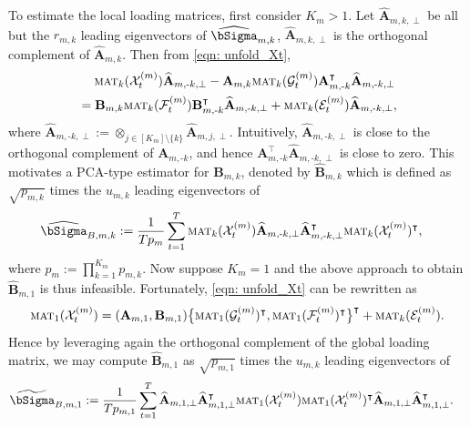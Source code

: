 \documentclass[aos]{imsart}
\theoremstyle{plain}
\theoremstyle{definition}
\def\mat{\textnormal{\textsc{mat}}}
\def\wt#1{\widetilde{#1}}
\def\wh#1{\widehat{#1}}
\def\cE{\mathcal{E}}
\def\cF{\mathcal{F}}
\def\cG{\mathcal{G}} \def\cH{\boldsymbol{\mathcal{H}}} \def\cI{\mathcal{I}}
\def\cX{\mathcal{X}}
\def\bA{\mathbf{A}}
\def\bB{\mathbf{B}}
\def\trans{\intercal}
\begin{document}
To estimate the local loading matrices, first consider $K_m> 1$. Let $\wh{\bA}_{m,k,\perp}$ be
all but the $r_{m,k}$ leading eigenvectors of $\wh\bSigma_{m,k}$,  $\wh{\bA}_{m,k,\perp}$ is the orthogonal complement of $\wh{\bA}_{m,k}$. Then from \eqref{eqn: unfold_Xt},
\begin{align*}
    &\;\quad
    \mat_k(\cX_t^{(m)}) \wh{\bA}_{m,\text{-}k,\perp} - \bA_{m,k} \mat_k(\cG_t^{(m)}) \bA_{m,\text{-}k}^\trans \wh{\bA}_{m,\text{-}k,\perp} \\
    &= \bB_{m,k} \mat_k(\cF_t^{(m)}) \bB_{m,\text{-}k}^\trans \wh{\bA}_{m,\text{-}k,\perp} + \mat_k(\cE_t^{(m)}) \wh{\bA}_{m,\text{-}k,\perp} ,
\end{align*}
where $\wh{\bA}_{m,\text{-}k,\perp} := \otimes_{j\in[K_m] \setminus\{k\}} \wh{\bA}_{m,j,\perp}$. Intuitively, $\wh{\bA}_{m,\text{-}k,\perp}$ is close to the orthogonal complement of $\bA_{m,\text{-}k}$, and hence $\bA_{m,\text{-}k}^\trans \wh{\bA}_{m,\text{-}k,\perp}$ is close to zero. This motivates a PCA-type estimator for $\bB_{m,k}$, denoted by $\wh{\bB}_{m,k}$ which is defined as $\sqrt{p_{m,k}}$ times the $u_{m,k}$ leading eigenvectors of
\begin{equation}
\label{eqn: def_hat_Sigma_B_mk}
\begin{split}
    \wh\bSigma_{B,m,k} &:= \frac{1}{Tp_m} \sum_{t=1}^T \mat_k(\cX_t^{(m)}) \wh{\bA}_{m,\text{-}k,\perp} \wh{\bA}_{m,\text{-}k,\perp}^\trans \mat_k(\cX_t^{(m)})^\trans ,
\end{split}
\end{equation}
where $p_m:= \prod_{k=1}^{K_m} p_{m,k}$. Now suppose $K_m=1$ and the above approach to obtain $\wh{\bB}_{m,1}$ is thus infeasible. Fortunately, \eqref{eqn: unfold_Xt} can be rewritten as
\[
\mat_1(\cX_t^{(m)}) = (\bA_{m,1}, \bB_{m,1}) \big\{ \mat_1(\cG_t^{(m)})^\trans, \mat_1(\cF_t^{(m)})^\trans \big\}^\trans + \mat_k(\cE_t^{(m)}) .
\]
Hence by leveraging again the orthogonal complement of the global loading matrix, we may compute $\wh{\bB}_{m,1}$ as $\sqrt{p_{m,1}}$ times the $u_{m,k}$ leading eigenvectors of
\begin{equation}
\label{eqn: def_tilde_Sigma_B_m1}
\begin{split}
    \wt\bSigma_{B,m,1} &:= \frac{1}{Tp_{m,1}} \sum_{t=1}^T \wh{\bA}_{m,1,\perp} \wh{\bA}_{m,1,\perp}^\trans \mat_1(\cX_t^{(m)}) \mat_1(\cX_t^{(m)})^\trans \wh{\bA}_{m,1,\perp} \wh{\bA}_{m,1,\perp}^\trans .
\end{split}
\end{equation}
\end{document}
